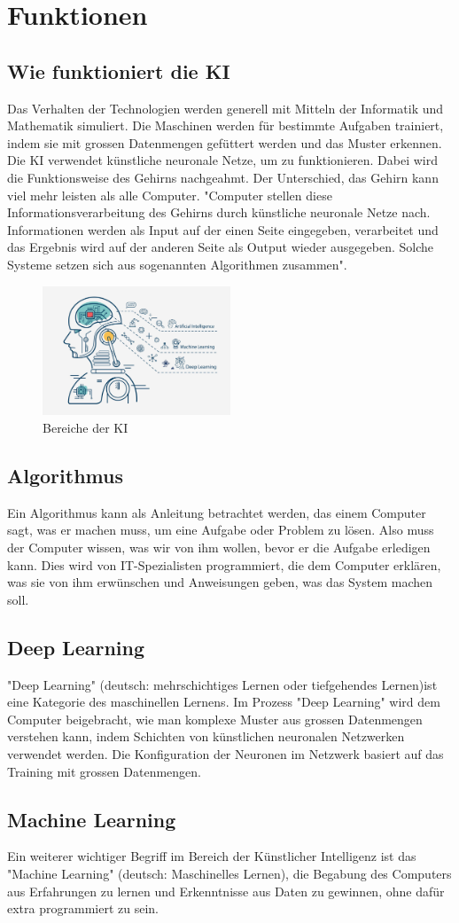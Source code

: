 \chapter{Funktionen}
\label{chap:methode}

\section{Wie funktioniert die KI}
Das Verhalten der Technologien werden generell mit Mitteln der Informatik und Mathematik simuliert. Die Maschinen werden für bestimmte Aufgaben trainiert, indem sie mit grossen Datenmengen gefüttert werden und das Muster erkennen. Die KI verwendet künstliche neuronale Netze, um zu funktionieren. Dabei wird die Funktionsweise des Gehirns nachgeahmt. Der Unterschied, das Gehirn kann viel mehr leisten als alle Computer. "Computer stellen diese Informationsverarbeitung  des Gehirns durch künstliche neuronale Netze nach. Informationen werden als Input auf der einen Seite eingegeben, verarbeitet und das Ergebnis wird auf der anderen Seite als Output wieder ausgegeben. Solche Systeme setzen sich aus sogenannten Algorithmen zusammen"\citep{ai-genius-community}.

\begin{figure}[h]
    \centering
    \includegraphics[width=0.5\textwidth]{AI.jpeg} 
    \caption{Bereiche der KI}
    \label{fig:ai}
\end{figure}

\section{Algorithmus}
Ein Algorithmus kann als Anleitung betrachtet werden, das einem Computer sagt, was er machen muss, um eine Aufgabe oder Problem zu lösen. Also muss der Computer wissen, was wir von ihm wollen, bevor er die Aufgabe erledigen kann. Dies wird von IT-Spezialisten programmiert, die dem Computer erklären, was sie von ihm erwünschen und Anweisungen geben, was das System machen soll.

\section{Deep Learning}
"Deep Learning" (deutsch: mehrschichtiges Lernen oder tiefgehendes Lernen)ist eine Kategorie des maschinellen Lernens.
Im Prozess "Deep Learning"   wird dem Computer beigebracht, wie man komplexe Muster aus grossen Datenmengen verstehen kann, indem Schichten von künstlichen neuronalen Netzwerken verwendet werden. Die Konfiguration der Neuronen im Netzwerk basiert auf das Training mit grossen Datenmengen.

\section{Machine Learning}
Ein weiterer wichtiger Begriff im Bereich der Künstlicher Intelligenz ist das "Machine Learning" (deutsch: Maschinelles Lernen), die Begabung des Computers aus Erfahrungen zu lernen und Erkenntnisse aus Daten zu gewinnen, ohne dafür extra programmiert zu sein.